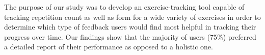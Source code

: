 The purpose of our study was to develop an exercise-tracking tool capable of tracking repetition count as well as form for a wide variety of exercises in order to determine which type of feedback users would find most helpful in tracking their progress over time. Our findings show that the majority of users (75\%) preferred a detailed report of their performance as opposed to a holistic one.